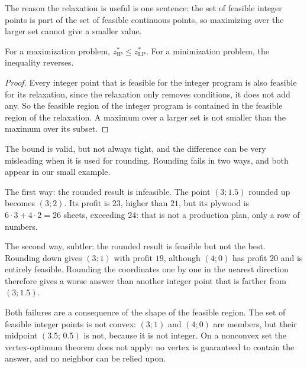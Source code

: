 
The reason the relaxation is useful is one sentence: the set of feasible integer points is part
of the set of feasible continuous points, so maximizing over the larger set cannot give a
smaller value.

\begin{proposisi}
For a maximization problem, $z^{*}_{\mathrm{IP}}\le z^{*}_{\mathrm{LP}}$. For a minimization
problem, the inequality reverses.
\end{proposisi}

\begin{proof}
Every integer point that is feasible for the integer program is also feasible for its
relaxation, since the relaxation only removes conditions, it does not add any. So the feasible
region of the integer program is contained in the feasible region of the relaxation. A maximum
over a larger set is not smaller than the maximum over its subset.
\end{proof}

The bound is valid, but not always tight, and the difference can be very misleading when it is
used for rounding. Rounding fails in two ways, and both appear in our small example.

The first way: the rounded result is infeasible. The point $(3;1.5)$ rounded up becomes
$(3;2)$. Its profit is $23$, higher than $21$, but its plywood is
$6\cdot3+4\cdot2=26$ sheets, exceeding $24$: that is not a production plan, only a row of
numbers.

The second way, subtler: the rounded result is feasible but not the best. Rounding down gives
$(3;1)$ with profit $19$, although $(4;0)$ has profit $20$ and is entirely feasible.
Rounding the coordinates one by one in the nearest direction therefore gives a worse answer
than another integer point that is farther from $(3;1.5)$.

Both failures are a consequence of the shape of the feasible region. The set of feasible
integer points is not convex: $(3;1)$ and $(4;0)$ are members, but their midpoint
$(3.5;\,0.5)$ is not, because it is not integer. On a nonconvex set the vertex-optimum theorem
does not apply: no vertex is guaranteed to contain the answer, and no neighbor can be relied
upon.

